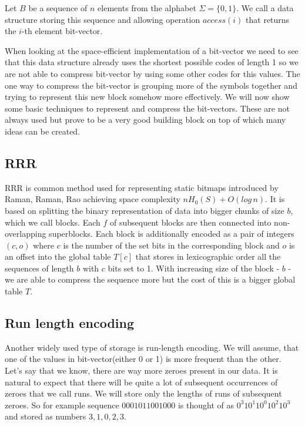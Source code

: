 \begin{theorem}
Let $B$ be a sequence of $n$ elements from the alphabet $\Sigma = \{0, 1\}$. We call a data structure storing this sequence
and allowing operation $access(i)$ that returns the $i$-th element bit-vector.
\end{theorem}

When looking at the space-efficient implementation of a bit-vector we need to see that this data structure already uses the shortest possible codes of length 1 so we are not able to compress bit-vector by using some other codes for this values. The one way to compress the bit-vector is grouping more of the symbols together and trying to represent this new block somehow more effectively. We will now show some basic techniques to represent and compress the bit-vectors. These are not always used but prove to be a very good building block on top of which many ideas can be created.

\subsection{RRR}

RRR is common method used for representing static bitmaps introduced by Raman, Raman, Rao \cite{raman2007succinct} achieving space complexity $nH_0(S) + O(log\,n)$. It is based on splitting the binary representation of data into bigger chunks of size $b$, which we call blocks.
Each $f$ of subsequent blocks are then connected into non-overlapping superblocks. Each block is additionally encoded as a pair of integers $(c, o)$ where $c$
is the number of the set bits in the corresponding block and $o$ is an offset into the global table $T[c]$ that stores in lexicographic order all the sequences of
length $b$ with $c$ bits set to 1. With increasing size of the block - $b$ - we are able to compress the sequence more but the cost of this is a bigger global table $T$.

\subsection{Run length encoding}

Another widely used type of storage is run-length encoding. We will assume, that one of the values in bit-vector(either 0 or 1) is more frequent than the other. Let's say that we know, there are way more zeroes present in our data. It is natural to expect that there will be quite a lot of subsequent occurrences of zeroes that we call runs. We will store only the lengths of runs of subsequent zeroes. So for example
sequence $0001011001000$ is thought of as $0^{3}10^{1}10^{0}10^{2}10^{3}$ and stored as numbers $3, 1, 0, 2, 3$.

